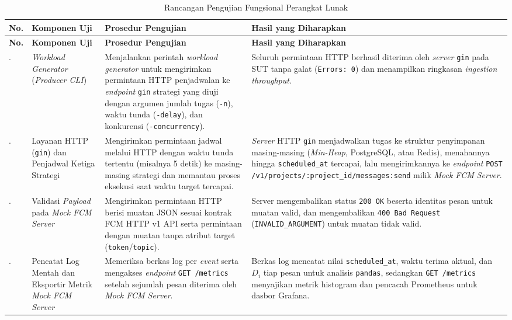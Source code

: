 {\footnotesize\setlength{\tabcolsep}{4pt}%
\begin{longtable}{|>{\centering\arraybackslash}p{}|>{\raggedright\arraybackslash}p{}|>{\raggedright\arraybackslash}p{}|>{\raggedright\arraybackslash}p{}|}
	\caption{Rancangan Pengujian Fungsional Perangkat Lunak}
	\label{table:3.uji_fungsional}\\
	\hline
	\textbf{No.} & \textbf{Komponen Uji} & \textbf{Prosedur Pengujian} & \textbf{Hasil yang Diharapkan} \\
	\hline
	\endfirsthead
	\hline
	\textbf{No.} & \textbf{Komponen Uji} & \textbf{Prosedur Pengujian} & \textbf{Hasil yang Diharapkan} \\
	\hline
	\endhead
	1. & \textit{Workload Generator} (\textit{Producer CLI}) & Menjalankan perintah \textit{workload generator} untuk mengirimkan permintaan HTTP penjadwalan ke \textit{endpoint} \texttt{gin} strategi yang diuji dengan argumen jumlah tugas (\texttt{-n}), waktu tunda (\texttt{-delay}), dan konkurensi (\texttt{-concurrency}). & Seluruh permintaan HTTP berhasil diterima oleh \textit{server} \texttt{gin} pada SUT tanpa galat (\texttt{Errors: 0}) dan menampilkan ringkasan \textit{ingestion throughput}. \\
	\hline
	2. & Layanan HTTP (\texttt{gin}) dan Penjadwal Ketiga Strategi & Mengirimkan permintaan jadwal melalui HTTP dengan waktu tunda tertentu (misalnya 5 detik) ke masing-masing strategi dan memantau proses eksekusi saat waktu target tercapai. & \textit{Server} HTTP \texttt{gin} menjadwalkan tugas ke struktur penyimpanan masing-masing (\textit{Min-Heap}, PostgreSQL, atau Redis), menahannya hingga \texttt{scheduled\_at} tercapai, lalu mengirimkannya ke \textit{endpoint} \texttt{POST /v1/projects/}\allowbreak\texttt{:project\_id/}\allowbreak\texttt{messages:send} milik \textit{Mock FCM Server}. \\
	\hline
	3. & Validasi \textit{Payload} pada \textit{Mock FCM Server} & Mengirimkan permintaan HTTP berisi muatan JSON sesuai kontrak FCM HTTP v1 API serta permintaan dengan muatan tanpa atribut target (\texttt{token}/\allowbreak\texttt{topic}). & Server mengembalikan status \texttt{200 OK} beserta identitas pesan untuk muatan valid, dan mengembalikan \texttt{400 Bad Request} (\texttt{INVALID\_}\allowbreak\texttt{ARGUMENT}) untuk muatan tidak valid. \\
	\hline
	4. & Pencatat Log Mentah dan Eksportir Metrik \textit{Mock FCM Server} & Memeriksa berkas log per \textit{event} serta mengakses \textit{endpoint} \texttt{GET /metrics} setelah sejumlah pesan diterima oleh \textit{Mock FCM Server}. & Berkas log mencatat nilai \texttt{scheduled\_at}, waktu terima aktual, dan $D_i$ tiap pesan untuk analisis \texttt{pandas}, sedangkan \texttt{GET /metrics} menyajikan metrik histogram dan pencacah Prometheus untuk dasbor Grafana. \\

\end{longtable}}
